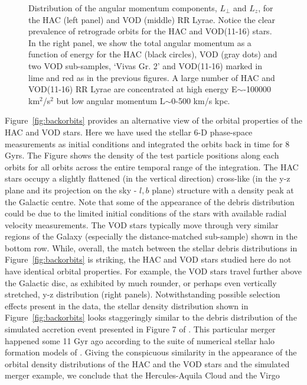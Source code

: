 \documentclass[fleqn,usenatbib]{mnras}
\begin{document}
\begin{figure}
		       	       	       	       \vspace{-0.45cm}
   \caption{Distribution of the angular momentum components, $L_{\perp}$ and $L_{z}$,  for the HAC (left panel) and VOD (middle) RR Lyrae. Notice the clear prevalence of retrograde orbits for the HAC and VOD(11-16) stars. In the right panel, we show the total angular momentum as a function of energy for the HAC (black circles), VOD (gray dots) and two VOD sub-samples, `Vivas Gr. 2' and VOD(11-16) marked in lime and red as in the previous figures. A large number of HAC and VOD(11-16) RR Lyrae are concentrated at high energy E$\sim$-100000 km$^{2}$/s$^{2}$ but low angular momentum L$\sim$0-500 km/s kpc.}
    \label{fig:energy}
\end{figure}
%
Figure~\ref{fig:backorbits} provides an alternative view of the
orbital properties of the HAC and VOD stars. Here we have used the
stellar 6-D phase-space measurements as initial conditions and
integrated the orbits back in time for 8 Gyrs. The Figure shows the
density of the test particle positions along each orbits for all
orbits across the entire temporal range of the integration. The HAC
stars occupy a slightly flattened (in the vertical direction)
cross-like (in the y-z plane and its projection on the sky - $l,b$
plane) structure with a density peak at the Galactic centre. Note that
some of the appearance of the debris distribution could be due to the
limited initial conditions of the stars with available radial velocity
measurements. The VOD stars typically move through very similar
regions of the Galaxy (especially the distance-matched sub-sample)
shown in the bottom row. While, overall, the match between the stellar
debris distributions in Figure~\ref{fig:backorbits} is striking, the
HAC and VOD stars studied here do not have identical orbital
properties. For example, the VOD stars travel further above the
Galactic disc, as exhibited by much rounder, or perhaps even
vertically stretched, y-z distribution (right panels).
%
Notwithstanding possible selection effects present in the data, the
stellar density distribution shown in Figure~\ref{fig:backorbits}
looks staggeringly similar to the debris distribution of the simulated
accretion event presented in Figure 7 of \citet{Simion2018}. This
particular merger happened some 11 Gyr ago according to the suite of
numerical stellar halo formation models of \citet{Bu05}. Giving the
conspicuous similarity in the appearance of the orbital density
distributions of the HAC and the VOD stars and the simulated merger
example, we conclude that the Hercules-Aquila Cloud and the Virgo
\end{document}
